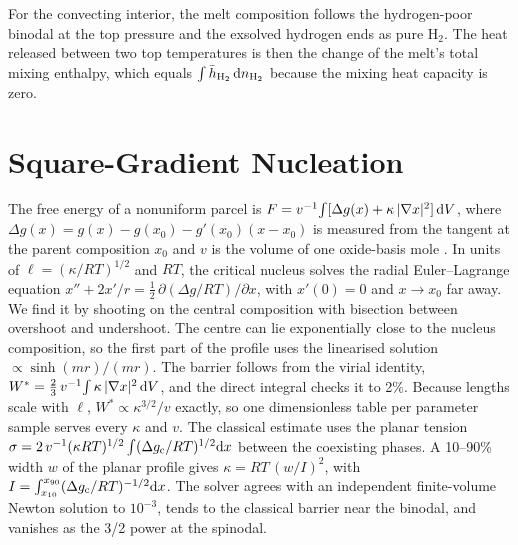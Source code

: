 For the convecting interior, the melt composition follows the hydrogen-poor binodal at the top
pressure and the exsolved hydrogen ends as pure H$_2$. The heat released between two top
temperatures is then the change of the melt's total mixing enthalpy, which equals
$\int \bar h_{\rm H_2}\,{\rm d}n_{\rm H_2}$ because the mixing heat capacity is zero.

\section{Square-Gradient Nucleation}\label{app:nucleation}

The free energy of a nonuniform parcel is
$F = v^{-1}\!\int [\Delta g(x) + \kappa\,|\nabla x|^2]\,{\rm d}V$, where
$\Delta g(x) = g(x) - g(x_0) - g'(x_0)(x - x_0)$ is measured from the tangent at the parent
composition $x_0$ and $v$ is the volume of one oxide-basis mole \cite{cahn1958,cahn1959}. In
units of $\ell = (\kappa/RT)^{1/2}$ and $RT$, the critical nucleus solves the radial
Euler--Lagrange equation $x'' + 2x'/r = \tfrac12\,\partial(\Delta g/RT)/\partial x$, with $x'(0)=0$
and $x\to x_0$ far away. We find it by shooting on the central composition with bisection
between overshoot and undershoot. The centre can lie exponentially close to the nucleus
composition, so the first part of the profile uses the linearised solution
$\propto \sinh(mr)/(mr)$. The barrier follows from the virial identity,
$W^* = \tfrac{2}{3}\,v^{-1}\!\int \kappa\,|\nabla x|^2\,{\rm d}V$, and the direct integral checks
it to 2\%. Because lengths scale with $\ell$, $W^* \propto \kappa^{3/2}/v$ exactly, so one
dimensionless table per parameter sample serves every $\kappa$ and $v$. The classical estimate
uses the planar tension $\sigma = 2\,v^{-1}(\kappa RT)^{1/2}\int (\Delta g_{\rm c}/RT)^{1/2}{\rm
d}x$ between the coexisting phases. A 10--90\% width $w$ of the planar profile gives
$\kappa = RT\,(w/I)^2$, with $I = \int_{x_{10}}^{x_{90}} (\Delta g_{\rm c}/RT)^{-1/2}{\rm d}x$.
The solver agrees with an independent finite-volume Newton solution to $10^{-3}$, tends to the
classical barrier near the binodal, and vanishes as the 3/2 power at the spinodal.

